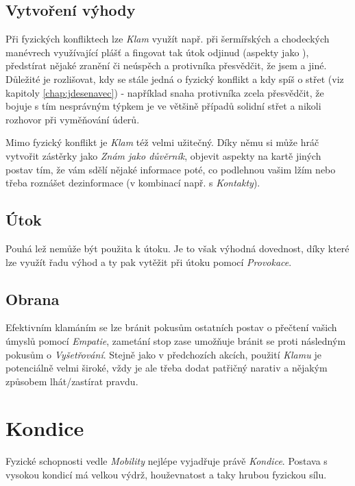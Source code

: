 \documentclass[../main.tex]{subfiles}
\begin{document}
\subsection*{Vytvoření výhody}
\label{subsec:klam-vytvoreni}
\vytvoreni

Při fyzických konfliktech lze \textit{Klam} využít např. při šermířských a chodeckých manévrech využívající plášť a fingovat tak útok odjinud (aspekty jako ), předstírat nějaké zranění či neúspěch a protivníka přesvědčit, že jsem  a jiné. Důležité je rozlišovat, kdy se stále jedná o fyzický konflikt a kdy spíš o střet (viz kapitoly \ref{chap:jdesenavec}) - například snaha protivníka zcela přesvědčit, že bojuje s tím nesprávným týpkem je ve většině případů solidní střet a nikoli rozhovor při vyměňování úderů.

Mimo fyzický konflikt je \textit{Klam} též velmi užitečný. Díky němu si může hráč vytvořit zástěrky jako \textit{Znám jako důvěrník}, objevit aspekty na kartě jiných postav tím, že vám sdělí nějaké informace poté, co podlehnou vašim lžím nebo třeba roznášet dezinformace (v kombinací např. s \textit{Kontakty}).

\subsection*{Útok}
\label{subsec:klam-utok}
\utok

Pouhá lež nemůže být použita k útoku. Je to však výhodná dovednost, díky které lze využít řadu výhod a ty pak vytěžit při útoku pomocí \textit{Provokace}.

\subsection*{Obrana}
\label{subsec:klam-obrana}
\obrana

Efektivním klamáním se lze bránit pokusům ostatních postav o přečtení vašich úmyslů pomocí \textit{Empatie}, zametání stop zase umožňuje bránit se proti následným pokusům o \textit{Vyšetřování}. Stejně jako v předchozích akcích, použití \textit{Klamu} je potenciálně velmi široké, vždy je ale třeba dodat patřičný narativ a nějakým způsobem lhát/zastírat pravdu.

\section{Kondice}
\label{sec:kondice}

Fyzické schopnosti vedle \textit{Mobility} nejlépe vyjadřuje právě \textit{Kondice}. Postava s vysokou kondicí má velkou výdrž, houževnatost a taky hrubou fyzickou sílu. 
\end{document}
